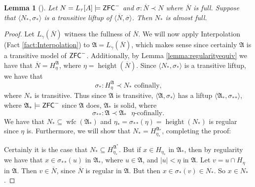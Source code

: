 \documentclass{amsart}
\newtheorem{lemma}[theorem]{Lemma}
\theoremstyle{definition}
\theoremstyle{remark}
\newcommand{\N}{{\overline{N}}}
\newcommand{\ZFC}{\textup{\ensuremath{\textsf{ZFC}}}}
\DeclareMathOperator{\height}{height}
\DeclareMathOperator{\wfc}{wfc}
\begin{document}
\begin{lemma}[{\cite[Lemma 2.1]{Jensen:2014}}] \label{lemma:liftupfull} Let $N =L_\tau[A] \models \ZFC^-$ and $\sigma: \N \prec N$ where $\N$ is full. Suppose that $\langle N_*, \sigma_* \rangle$ is a transitive liftup of $\langle \N, \overline \sigma \rangle$. Then $N_*$ is almost full. \end{lemma}
\begin{proof}
	Let $L_\gamma(\N)$ witness the fullness of $\N$. We will now apply Interpolation (Fact \ref{fact:Interpolation}) to $\mathfrak A= L_\gamma(\N)$, which makes sense since certainly $\mathfrak A$ is a transitive model of $\ZFC^-$. Additionally, by Lemma \ref{lemma:regularityequiv} we have that $\N = H_\eta^{\mathfrak A}$, where $\eta = \height(\N)$. 
	Since $\langle N_*, \sigma_* \rangle$ is a transitive liftup, we have that $$\sigma_*: H_\eta^{\mathfrak A} \prec N_* \text{ cofinally,}$$ where $N_*$ is transitive. Thus since $\mathfrak A$ is transitive, $\langle \mathfrak A, \sigma_* \rangle$ has a liftup $\langle \mathfrak A_*, {\sigma_*}_* \rangle$, where $\mathfrak A_* \models \ZFC^-$ since $\mathfrak A$ does, $\mathfrak A_*$ is solid, where $${\sigma_*}_* : \mathfrak A \prec \mathfrak A_* \text{ $\eta$-cofinally.}$$ 
	We have that  $N_* \subseteq \wfc({\mathfrak A}_*)$ and $\eta_*= {\sigma_*}_*(\eta)=\height(N_*)$ is regular since $\eta$ is. Furthermore, we will show that $N_* = H_{\eta_*}^{\mathfrak A_*}$, completing the proof:
	
	Certainly it is the case that $N_* \subseteq H_{\eta_*}^{\mathfrak A^*}$. 
	But if $x \in H_{\eta_*}$ in $\mathfrak A_*$, then by regularity we have that $x \in {\sigma_*}_*(u)$ in $\mathfrak A_*$, where $u \in \mathfrak A$, and $|u| < \eta$ in $\mathfrak A$. Let $v=u \cap H_\eta$ in $\mathfrak A$. Then $v \in \N$, since $\N$ is regular in $\mathfrak A$. But then $x \in \sigma_*(v) \in N_*$. So $x \in N_*$.
\end{proof}
\end{document}
